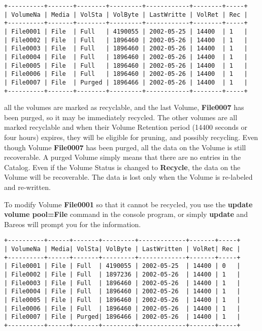 \footnotesize
\begin{verbatim}
+----------+-------+--------+---------+------------+--------+-----+
| VolumeNa | Media | VolSta | VolByte | LastWritte | VolRet | Rec |
+----------+-------+--------+---------+------------+--------+-----+
| File0001 | File  | Full   | 4190055 | 2002-05-25 | 14400  | 1   |
| File0002 | File  | Full   | 1896460 | 2002-05-26 | 14400  | 1   |
| File0003 | File  | Full   | 1896460 | 2002-05-26 | 14400  | 1   |
| File0004 | File  | Full   | 1896460 | 2002-05-26 | 14400  | 1   |
| File0005 | File  | Full   | 1896460 | 2002-05-26 | 14400  | 1   |
| File0006 | File  | Full   | 1896460 | 2002-05-26 | 14400  | 1   |
| File0007 | File  | Purged | 1896466 | 2002-05-26 | 14400  | 1   |
+----------+-------+--------+---------+------------+--------+-----+
\end{verbatim}
\normalsize

all the volumes are marked as recyclable, and the last Volume, {\bf File0007}
has been purged, so it may be immediately recycled. The other volumes are all
marked recyclable and when their Volume Retention period (14400 seconds or four
hours) expires, they will be eligible for pruning, and possibly recycling.
Even though Volume {\bf File0007} has been purged, all the data on the Volume
is still recoverable. A purged Volume simply means that there are no entries
in the Catalog. Even if the Volume Status is changed to {\bf Recycle}, the
data on the Volume will be recoverable. The data is lost only when the Volume
is re-labeled and re-written.

To modify Volume {\bf File0001} so that it cannot be recycled, you use the
{\bf update volume pool=File} command in the console program, or simply {\bf
update} and Bareos will prompt you for the information.

\footnotesize
\begin{verbatim}
+----------+------+-------+---------+-------------+-------+-----+
| VolumeNa | Media| VolSta| VolByte | LastWritten | VolRet| Rec |
+----------+------+-------+---------+-------------+-------+-----+
| File0001 | File | Full  | 4190055 | 2002-05-25  | 14400 | 0   |
| File0002 | File | Full  | 1897236 | 2002-05-26  | 14400 | 1   |
| File0003 | File | Full  | 1896460 | 2002-05-26  | 14400 | 1   |
| File0004 | File | Full  | 1896460 | 2002-05-26  | 14400 | 1   |
| File0005 | File | Full  | 1896460 | 2002-05-26  | 14400 | 1   |
| File0006 | File | Full  | 1896460 | 2002-05-26  | 14400 | 1   |
| File0007 | File | Purged| 1896466 | 2002-05-26  | 14400 | 1   |
+----------+------+-------+---------+-------------+-------+-----+
\end{verbatim}
\normalsize

